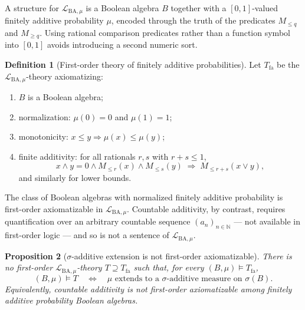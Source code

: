 \documentclass[11pt]{article}
\newtheorem{proposition}{Proposition}
\theoremstyle{definition}
\newtheorem{definition}[proposition]{Definition}
\newcommand{\Lmu}{\mathcal{L}_{\mathrm{BA},\mu}}
\newcommand{\Tfa}{T_{\mathrm{fa}}}
\newcommand{\N}{\mathbb{N}}
\begin{document}
A structure for $\Lmu$ is a Boolean algebra $B$ together with a $[0,1]$-valued finitely
additive probability $\mu$, encoded through the truth of the predicates $M_{\leq q}$
and $M_{\geq q}$.  Using rational comparison predicates rather than a function symbol
into $[0,1]$ avoids introducing a second numeric sort.

\begin{definition}[First-order theory of finitely additive probabilities]
Let $\Tfa$ be the $\Lmu$-theory axiomatizing:
\begin{enumerate}[label=(\roman*)]
  \item $B$ is a Boolean algebra;
  \item normalization: $\mu(0) = 0$ and $\mu(1) = 1$;
  \item monotonicity: $x \leq y \Rightarrow \mu(x) \leq \mu(y)$;
  \item finite additivity: for all rationals $r, s$ with $r + s \leq 1$,
        \[
          x \wedge y = 0 \wedge M_{\leq r}(x) \wedge M_{\leq s}(y)
          \;\Rightarrow\; M_{\leq r+s}(x \vee y),
        \]
        and similarly for lower bounds.
\end{enumerate}
\end{definition}

\noindent
The class of Boolean algebras with normalized finitely additive probability is
first-order axiomatizable in $\Lmu$.  Countable additivity, by contrast, requires
quantification over an arbitrary countable sequence $(a_n)_{n \in \N}$ --- not
available in first-order logic --- and so is not a sentence of $\Lmu$.

\medskip

\begin{proposition}[$\sigma$-additive extension is not first-order axiomatizable]
\label{prop:not-fo}
There is no first-order $\Lmu$-theory $T \supseteq \Tfa$ such that, for every
$(B, \mu) \models \Tfa$,
\[
  (B, \mu) \models T \quad\Longleftrightarrow\quad
  \mu \text{ extends to a $\sigma$-additive measure on } \sigma(B).
\]
Equivalently, countable additivity is not first-order axiomatizable among
finitely additive probability Boolean algebras.
\end{proposition}
\end{document}
